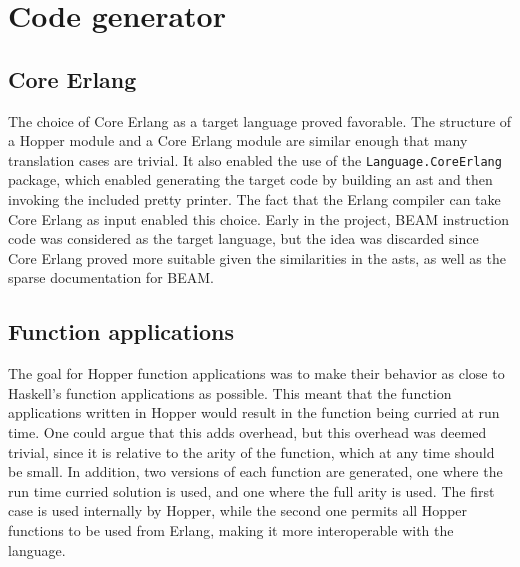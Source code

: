 \section{Code generator}

\subsection{Core Erlang}

The choice of Core Erlang as a target language proved favorable. The structure of a Hopper module and a Core Erlang module are similar enough that many translation cases are trivial. It also enabled the use of the \texttt{Language.CoreErlang}\cite{CoreErlang} package, which enabled generating the target code by building an \gls{ast} and then invoking the included pretty printer. The fact that the Erlang compiler can take Core Erlang as input enabled this choice. Early in the project, BEAM instruction code was considered as the target language, but the idea was discarded since Core Erlang proved more suitable given the similarities in the \glspl{ast}, as well as the sparse documentation for BEAM.

\subsection{Function applications}

The goal for Hopper function applications was to make their behavior as close to Haskell's function applications as possible. This meant that the function applications written in Hopper would result in the function being curried at run time. One could argue that this adds overhead, but this overhead was deemed trivial, since it is relative to the arity of the function, which at any time should be small. In addition, two versions of each function are generated, one where the run time curried solution is used, and one where the full arity is used. The first case is used internally by Hopper, while the second one permits all Hopper functions to be used from Erlang, making it more interoperable with the language.